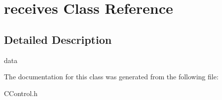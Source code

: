\hypertarget{classreceives}{}\section{receives Class Reference}
\label{classreceives}


\subsection{Detailed Description}
data 

The documentation for this class was generated from the following file\+:\begin{DoxyCompactItemize}
\item 
C\+Control.\+h\end{DoxyCompactItemize}
